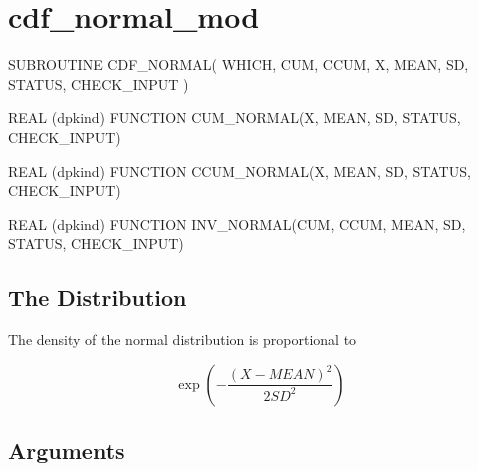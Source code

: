 \documentclass[12pt,dvips]{article}
\newcommand{\mysection}[1]{\color{blue}
             \section{#1} \normalcolor}
\newcommand{\mysubsection}[1] {\color{green}
             \subsection{#1} \normalcolor}
\begin{document}
\pagebreak

\mysection{cdf\_normal\_mod}

\begin{description}

\item SUBROUTINE CDF\_NORMAL( WHICH, CUM, CCUM, X, MEAN, SD,
STATUS, CHECK\_INPUT )

\item REAL (dpkind) FUNCTION CUM\_NORMAL(X, MEAN, SD,
 STATUS, CHECK\_INPUT)

\item REAL (dpkind) FUNCTION CCUM\_NORMAL(X, MEAN, SD, STATUS,
CHECK\_INPUT)

\item REAL (dpkind) FUNCTION INV\_NORMAL(CUM, CCUM, MEAN, SD, STATUS,
CHECK\_INPUT)

\end{description}

\mysubsection{The Distribution}

The density of the normal distribution is proportional to

\[ \exp\left(-\frac{(X-MEAN)^2}{2 SD^2}\right) \]

\mysubsection{Arguments}
\end{document}
